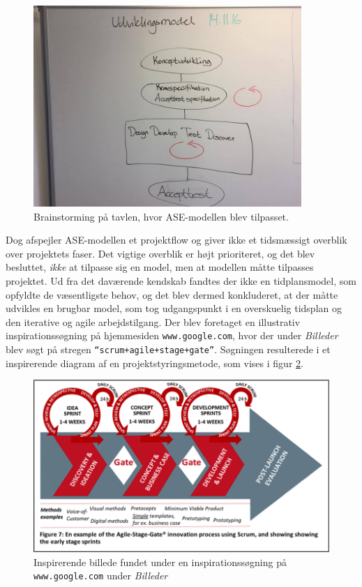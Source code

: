 	\begin{figure}[htb]
		\centering
		\includegraphics[width=4in]{ASEbrain.jpg}
		\caption{Brainstorming på tavlen, hvor ASE-modellen blev tilpasset.}
		\label{fig:ASEbrain}	
	\end{figure}
	
	 Dog afspejler ASE-modellen et projektflow og giver ikke et tidsmæssigt overblik over projektets faser. Det vigtige overblik er højt prioriteret, og det blev besluttet, \textit{ikke} at tilpasse sig en model, men at modellen måtte tilpasses projektet. Ud fra det daværende kendskab fandtes der ikke en tidplansmodel, som opfyldte de væsentligste behov, og det blev dermed konkluderet, at der måtte udvikles en brugbar model, som tog udgangspunkt i en overskuelig tidsplan og den iterative og agile arbejdstilgang. Der blev foretaget en illustrativ inspirationssøgning på hjemmesiden \texttt{www.google.com}, hvor der under \textit{Billeder} blev søgt på stregen \texttt{“scrum+agile+stage+gate”}. Søgningen resulterede i et inspirerende diagram af en projektstyringsmetode, som vises i figur \ref{fig:inspidia}.  
	
	\begin{figure}[htb]
		\centering
		\includegraphics[width=5in]{inspirerendediagram}
		\caption{Inspirerende billede fundet under en inspirationssøgning på \texttt{www.google.com} under \textit{Billeder}}
		\label{fig:inspidia}	
	\end{figure}

